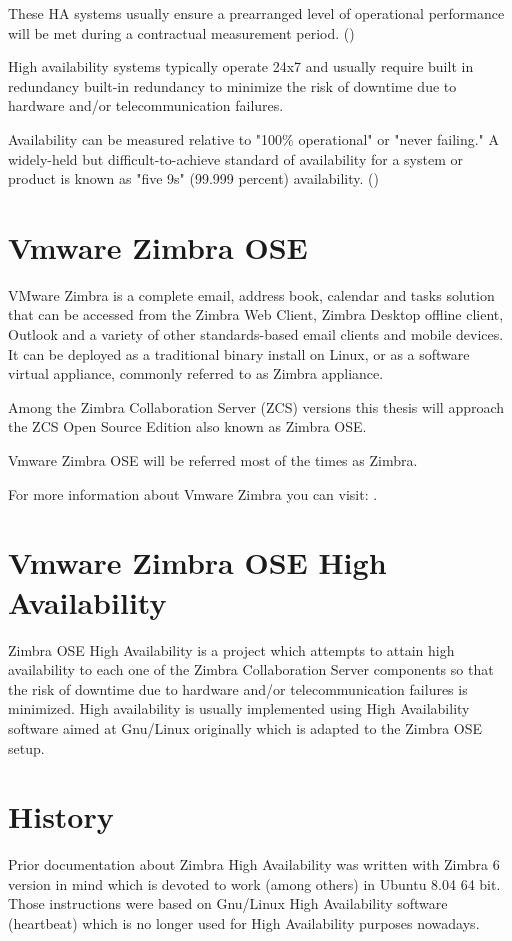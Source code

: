 These HA systems usually ensure a prearranged level of operational performance will be met during a contractual measurement period. (\cite{WikipediaHA})

High availability systems typically operate 24x7 and usually require built in redundancy built-in redundancy to minimize the risk of downtime due to hardware and/or telecommunication failures. 

Availability can be measured relative to "100\% operational" or "never failing." A widely-held but difficult-to-achieve standard of availability for a system or product is known as "five 9s" (99.999 percent) availability. (\cite{BCMHA})


\section {Vmware Zimbra OSE}
VMware Zimbra is a complete email, address book, calendar and tasks solution that can be accessed from the Zimbra Web Client, Zimbra Desktop offline client, Outlook and a variety of other standards-based email clients and mobile devices. It can be deployed as a traditional binary install on Linux, or as a software virtual appliance, commonly referred to as Zimbra appliance.

Among the Zimbra Collaboration Server (ZCS) versions this thesis will approach the ZCS Open Source Edition also known as Zimbra OSE.

Vmware Zimbra OSE will be referred most of the times as Zimbra.

For more information about Vmware Zimbra you can visit: \cite{ZimbraLearn}.

\section {Vmware Zimbra OSE High Availability}
Zimbra OSE High Availability is a project which attempts to attain high availability to each one of the Zimbra Collaboration Server components so that the risk of downtime due to hardware and/or telecommunication failures is minimized. High availability is usually implemented using High Availability software aimed at Gnu/Linux originally which is adapted to the Zimbra OSE setup.


\section{History}

Prior documentation about Zimbra High Availability was written with Zimbra 6 version in mind which is devoted to work (among others) in Ubuntu 8.04 64 bit. Those instructions were based on Gnu/Linux High Availability software (heartbeat) which is no longer used for High Availability purposes nowadays.

